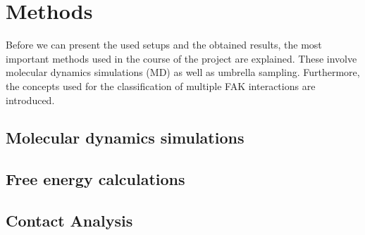 \chapter{Methods}
Before we can present the used setups and the obtained results, the most important methods used in the course of the project are explained. These involve molecular dynamics simulations (MD) as well as umbrella sampling. Furthermore, the concepts used for the classification of multiple FAK interactions are introduced.
\section{Molecular dynamics simulations}

\section{Free energy calculations}

\section{Contact Analysis}
\label{methods:contactana}
